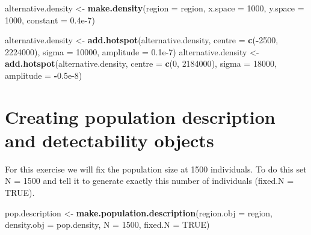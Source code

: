 \documentclass[]{book}
\newenvironment{Shaded}{\begin{snugshade}}{\end{snugshade}}
\newcommand{\KeywordTok}[1]{\textcolor[rgb]{0.13,0.29,0.53}{\textbf{#1}}}
\newcommand{\DataTypeTok}[1]{\textcolor[rgb]{0.13,0.29,0.53}{#1}}
\newcommand{\DecValTok}[1]{\textcolor[rgb]{0.00,0.00,0.81}{#1}}
\newcommand{\FloatTok}[1]{\textcolor[rgb]{0.00,0.00,0.81}{#1}}
\newcommand{\StringTok}[1]{\textcolor[rgb]{0.31,0.60,0.02}{#1}}
\newcommand{\OtherTok}[1]{\textcolor[rgb]{0.56,0.35,0.01}{#1}}
\newcommand{\OperatorTok}[1]{\textcolor[rgb]{0.81,0.36,0.00}{\textbf{#1}}}
\newcommand{\NormalTok}[1]{#1}
\theoremstyle{definition}
\theoremstyle{definition}
\theoremstyle{remark}
\begin{document}
\begin{Shaded}
\begin{Highlighting}[]
\NormalTok{alternative.density <-}\StringTok{ }\KeywordTok{make.density}\NormalTok{(}\DataTypeTok{region =}\NormalTok{ region, }\DataTypeTok{x.space =} \DecValTok{1000}\NormalTok{, }
                                    \DataTypeTok{y.space =} \DecValTok{1000}\NormalTok{, }\DataTypeTok{constant =} \FloatTok{0.4e-7}\NormalTok{)}

\NormalTok{alternative.density <-}\StringTok{ }\KeywordTok{add.hotspot}\NormalTok{(alternative.density, }\DataTypeTok{centre =} \KeywordTok{c}\NormalTok{(}\OperatorTok{-}\DecValTok{2500}\NormalTok{, }\DecValTok{2224000}\NormalTok{), }
                                   \DataTypeTok{sigma =} \DecValTok{10000}\NormalTok{, }\DataTypeTok{amplitude =} \FloatTok{0.1e-7}\NormalTok{)}
\NormalTok{alternative.density <-}\StringTok{ }\KeywordTok{add.hotspot}\NormalTok{(alternative.density, }\DataTypeTok{centre =} \KeywordTok{c}\NormalTok{(}\DecValTok{0}\NormalTok{, }\DecValTok{2184000}\NormalTok{), }
                                   \DataTypeTok{sigma =} \DecValTok{18000}\NormalTok{, }\DataTypeTok{amplitude =} \OperatorTok{-}\FloatTok{0.5e-8}\NormalTok{)}
\end{Highlighting}
\end{Shaded}

\section{Creating population description and detectability
objects}\label{creating-population-description-and-detectability-objects}

For this exercise we will fix the population size at 1500 individuals.
To do this set N = 1500 and tell it to generate exactly this number of
individuals (fixed.N = TRUE).

\begin{Shaded}
\begin{Highlighting}[]
\NormalTok{pop.description <-}\StringTok{ }\KeywordTok{make.population.description}\NormalTok{(}\DataTypeTok{region.obj =}\NormalTok{ region, }
                                               \DataTypeTok{density.obj =}\NormalTok{ pop.density, }
                                               \DataTypeTok{N =} \DecValTok{1500}\NormalTok{, }\DataTypeTok{fixed.N =} \OtherTok{TRUE}\NormalTok{)}
\end{Highlighting}
\end{Shaded}
\end{document}
